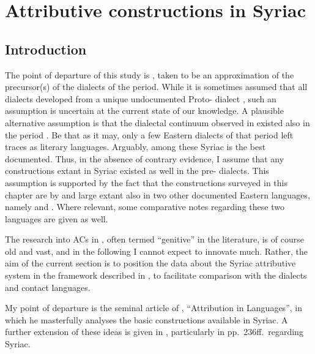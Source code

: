 \chapter{Attributive constructions in Syriac}
\label{ch:Syriac}
\renewcommand{\defaultDialect}{\Syr}

\section{Introduction}

The point of departure of this study is \Syr, taken to be an approximation of the precursor(s) of the  dialects of the \CAram period. While it is sometimes assumed that all  dialects developed from a unique undocumented Proto- dialect \citep[cf.][]{Hoberman1988history}, such an assumption is uncertain at the current state of our knowledge. A plausible alternative assumption is that the dialectal continuum observed in  existed also in the \CAram period \citep[cf.][512]{KimStammbaum}. Be that as it may, only a few Eastern dialects of that period left traces as literary languages. Arguably, among these Syriac is the best documented. Thus, in the absence of contrary evidence, I assume that any constructions extant in Syriac existed as well in the pre- dialects. This assumption is supported by the fact that the constructions surveyed in this chapter are by and large extant also in two other documented Eastern \CAram languages, namely \JBA and \CMand. Where relevant, some comparative notes regarding these two languages are given as well. 



The research into ACs in \Syr, often termed \enquote{genitive} in the literature, is of course old and vast, and in the following I cannot expect to innovate much. Rather, the aim of the current section is to position the data about the Syriac attributive system in the framework described in , to facilitate comparison with the  dialects and contact languages. 

My point of departure is the seminal article of \citet{GoldenbergAttribution}, \enquote{Attribution in  Languages}, in which he masterfully analyses the basic constructions available in Syriac. A further extension of these ideas is given in \citet[Ch.\ 14]{GoldenbergSemitic}, particularly in pp.\ 236ff.\ regarding Syriac.

